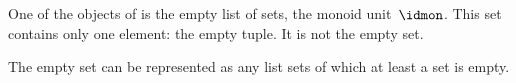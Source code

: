 One of the objects of \SetStar is the empty list of sets, the monoid unit~$\idmon$.
This set contains only one element: the empty tuple.
It is not the empty set.


The empty set can be represented as any list sets of which at least a set is empty.


%

\showslides{
    \begin{forslides}
        
        \begin{equation}
            \tupca \ela   = \ela
        \end{equation}
        ~
        \begin{equation}
            \label{eq:sets-monoid-el-cat}
            \tupcat \ela \elb \elconcat \elc = \tupcatt \ela \elb \elc
        \end{equation}
    \end{forslides}
}
